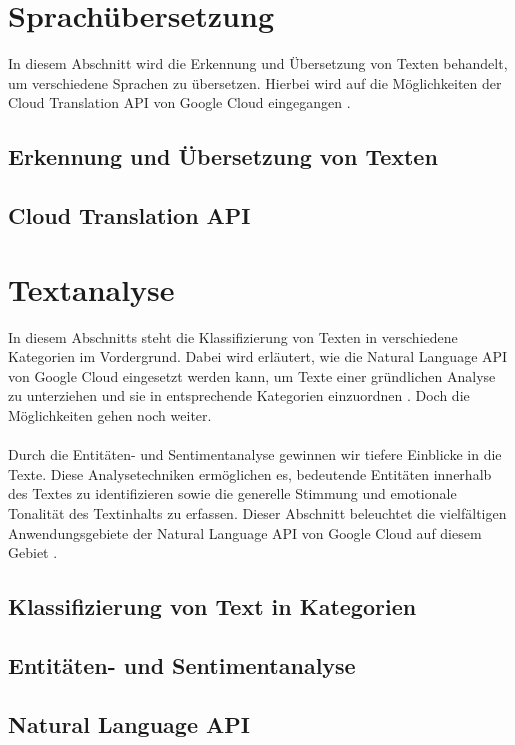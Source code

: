 \documentclass[12pt,a4paper]{article}
\begin{document}
\newpage
\section{Sprachübersetzung}

In diesem Abschnitt wird die Erkennung und Übersetzung von Texten behandelt, um verschiedene Sprachen zu übersetzen. Hierbei wird auf die Möglichkeiten der Cloud Translation API von Google Cloud eingegangen \cite{cloudtranslation2023}.
\subsection{Erkennung und Übersetzung von Texten}
\subsection{Cloud Translation API}
\newpage

\section{Textanalyse}
In diesem Abschnitts steht die Klassifizierung von Texten in verschiedene Kategorien im Vordergrund. Dabei wird erläutert, wie die Natural Language API von Google Cloud eingesetzt werden kann, um Texte einer gründlichen Analyse zu unterziehen und sie in entsprechende Kategorien einzuordnen \cite{classtext2023}. Doch die Möglichkeiten gehen noch weiter. 
\\ \\
Durch die Entitäten- und Sentimentanalyse gewinnen wir tiefere Einblicke in die Texte. Diese Analysetechniken ermöglichen es, bedeutende Entitäten innerhalb des Textes zu identifizieren sowie die generelle Stimmung und emotionale Tonalität des Textinhalts zu erfassen. Dieser Abschnitt beleuchtet die vielfältigen Anwendungsgebiete der Natural Language API von Google Cloud auf diesem Gebiet \cite{entitysentiment2023}.
\subsection{Klassifizierung von Text in Kategorien}
\subsection{Entitäten- und Sentimentanalyse}
\subsection{Natural Language API}
\end{document}
